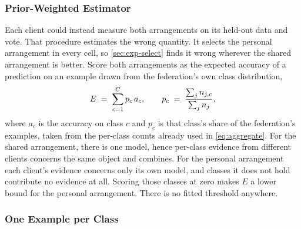 \subsubsection{Prior-Weighted Estimator}
Each client could instead measure both arrangements on its held-out data and
vote. That procedure estimates the wrong quantity. It selects the personal
arrangement in every cell, so \cref{sec:exp-select} finds it wrong wherever the
shared arrangement is better.
Score both arrangements as the expected accuracy of a prediction on an example
drawn from the federation's own class distribution,
\begin{equation}
\label{eq:estimator}
E \;=\; \sum_{c=1}^{C} p_c\,a_c,
\qquad
p_c \;=\; \frac{\sum_j n_{j,c}}{\sum_j n_j},
\end{equation}
where $a_c$ is the accuracy on class $c$ and $p_c$ is that class's share of the
federation's examples, taken from the per-class counts already used in
\cref{eq:aggregate}. For the shared arrangement, there is one model, hence
per-class evidence from different clients concerns the same object and combines.
For the personal arrangement each client's evidence concerns only its own model,
and classes it does not hold contribute no evidence at all. Scoring those classes
at zero makes $E$ a lower bound for the personal arrangement. There is no fitted
threshold anywhere.


\subsubsection{One Example per Class}

